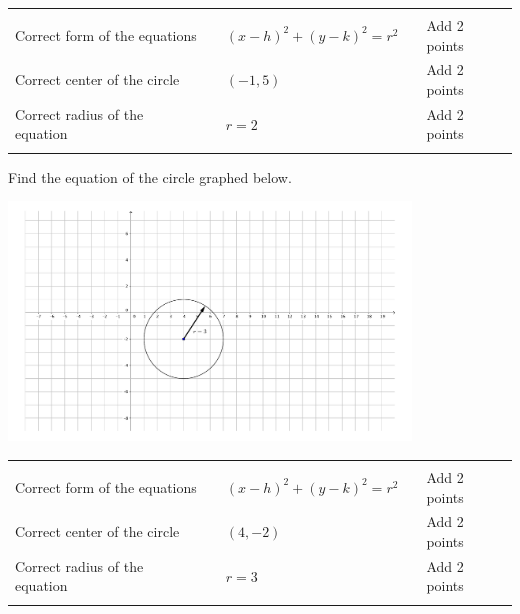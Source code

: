 {\begin{tabular}{lllll}
 &&&&\\ Correct form of the equations&&$(x-h)^2+(y-k)^2=r^2$&&Add 2 points\\
Correct center of the circle&&$(-1,5)$&&Add 2 points\\
Correct radius of the equation&&$r=2$&&Add 2 points\\ &&&&\\ \end{tabular}}


{Find the equation of the circle graphed below.

\noindent\includegraphics[height=2.5in]{MAT100_Number21d.pdf}}
{\begin{tabular}{lllll}
 &&&&\\ Correct form of the equations&&$(x-h)^2+(y-k)^2=r^2$&&Add 2 points\\
Correct center of the circle&&$(4,-2)$&&Add 2 points\\
Correct radius of the equation&&$r=3$&&Add 2 points\\ &&&&\\ \end{tabular}}
